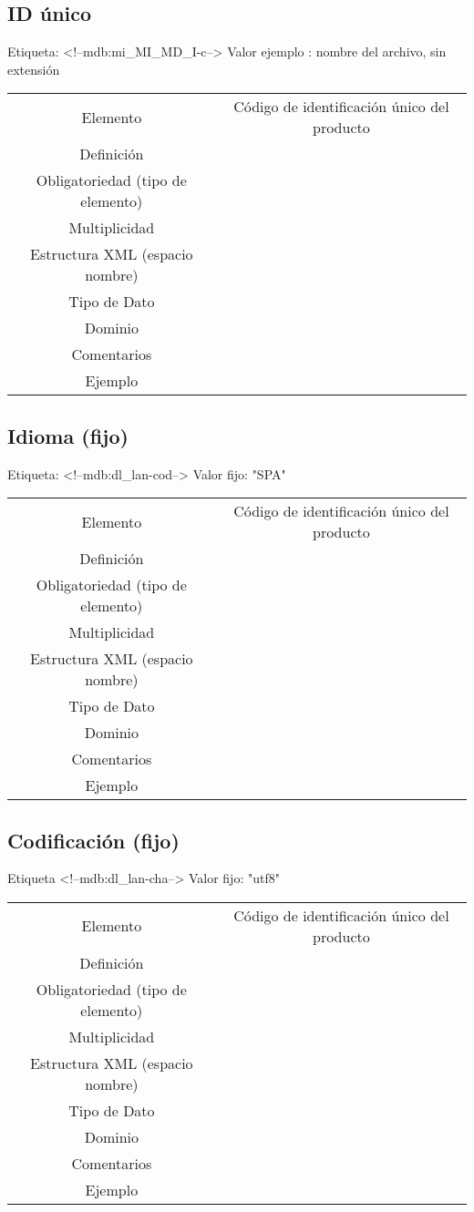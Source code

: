 \documentclass{GVT_CONAE_Class}
\begin{document}
\subsection{ID único}
Etiqueta:  <!--mdb:mi\_MI\_MD\_I-c--> 
Valor ejemplo : nombre del archivo, sin extensión
\begin{tabular}{c|c}
    Elemento & Código de identificación único del producto \\
    Definición & \\
    Obligatoriedad (tipo de elemento) & \\
    Multiplicidad & \\
    Estructura XML (espacio nombre) & \\
    Tipo de Dato & \\
    Dominio & \\
    Comentarios & \\
    Ejemplo & \\
\end{tabular}


\subsection{Idioma (fijo)}
Etiqueta: <!--mdb:dl\_lan-cod-->
Valor fijo: "SPA"
\begin{tabular}{c|c}
    Elemento & Código de identificación único del producto \\
    Definición & \\
    Obligatoriedad (tipo de elemento) & \\
    Multiplicidad & \\
    Estructura XML (espacio nombre) & \\
    Tipo de Dato & \\
    Dominio & \\
    Comentarios & \\
    Ejemplo & \\
\end{tabular}


\subsection{Codificación (fijo)}
Etiqueta <!--mdb:dl\_lan-cha-->
Valor fijo: "utf8"
\begin{tabular}{c|c}
    Elemento & Código de identificación único del producto \\
    Definición & \\
    Obligatoriedad (tipo de elemento) & \\
    Multiplicidad & \\
    Estructura XML (espacio nombre) & \\
    Tipo de Dato & \\
    Dominio & \\
    Comentarios & \\
    Ejemplo & \\
\end{tabular}
\end{document}
